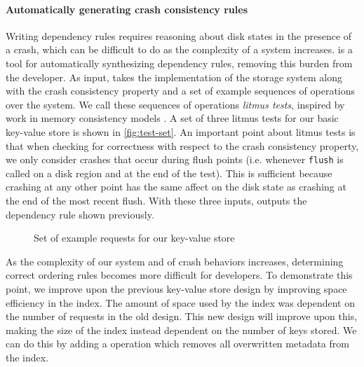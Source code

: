 \paragraph{Automatically generating crash consistency rules}
Writing dependency rules requires reasoning about disk states in the presence of a crash, which can
be difficult to do as the complexity of a system increases. \depsynth is a tool for automatically
synthesizing dependency rules, removing this burden from the developer. As input, \depsynth takes
the implementation of the storage system along with the crash consistency property and a set of
example sequences of operations over the system. We call these sequences of operations
\textit{litmus tests}, inspired by work in memory consistency models .
A set of three litmus tests for our basic key-value store is shown in \autoref{fig:test-set}.
An important point about litmus tests is that when checking for correctness with respect to the crash consistency
property, we only consider crashes that occur during flush points (i.e. whenever \texttt{flush} is called on
a disk region and at the end of the test). This is sufficient because crashing at any
other point has the same affect on the disk state as crashing at the end of the most recent flush.
With these three inputs, \depsynth outputs the dependency rule shown previously.

\begin{figure}[h]
  \centering
  \vspace{-.5em}
  \caption{Set of example requests for our key-value store}
  \label{fig:test-set}
\end{figure}

As the complexity of our system and of crash behaviors increases, determining
correct ordering rules becomes more difficult for developers.
To demonstrate this point, we improve upon the previous key-value store design by improving
space efficiency in the index. The amount of space used by the index was dependent on the number of \putreq
requests in the old design. This new design will improve upon this, making the size of the index instead
dependent on the number of keys stored. We can do this by adding a \clean operation which removes
all overwritten metadata from the index.


